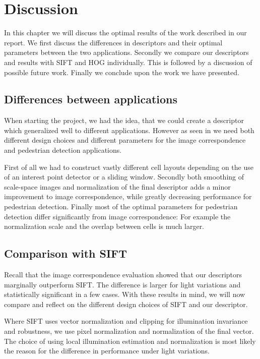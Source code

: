 \documentclass[thesis.tex]{subfiles}
\begin{document}
\chapter{Discussion}

In this chapter we will discuss the optimal results of the work described in our report.
We first discuss the differences in descriptors and their optimal parameters between the two applications. Secondly we compare our descriptors and results with SIFT and HOG individually.
This is followed by a discussion of possible future work. Finally we conclude upon the work we have presented.

\section{Differences between applications}
When starting the project, we had the idea, that we could create a descriptor which generalized well to different applications. However as seen in  we need both different design choices and different parameters for the image correspondence and pedestrian detection applications.

First of all we had to construct vastly different cell layouts depending on the use of an interest point detector or a sliding window. Secondly both smoothing of scale-space images and normalization of the final descriptor adds a minor improvement to image correspondence, while greatly decreasing performance for pedestrian detection. Finally most of the optimal parameters for pedestrian detection differ significantly from image correspondence: For example the normalization scale and the overlap between cells is much larger.
		
\section{Comparison with SIFT}
Recall that the image correspondence evaluation showed that our descriptors marginally outperform SIFT. The difference is larger for light variations and statistically significant in a few cases. With these results in mind, we will now compare and reflect on the different design choices of SIFT and our descriptor.

Where SIFT uses vector normalization and clipping for illumination invariance and robustness, we use pixel normalization and normalization of the final vector. The choice of using local illumination estimation and normalization is most likely the reason for the difference in performance under light variations.
\end{document}
